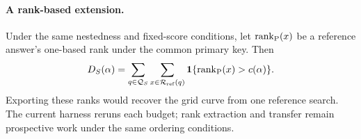 \paragraph{A rank-based extension.}
Under the same nestedness and fixed-score conditions, let
$\operatorname{rank}_{\rm P}(x)$ be a reference answer's one-based rank under the
common primary key. Then
\begin{equation}
 D_S(\alpha)=\sum_{q\in\mathcal Q_S}\sum_{x\in\mathcal R_{\rm ref}(q)}
 \mathbf1\{\operatorname{rank}_{\rm P}(x)>c(\alpha)\}.
 \label{eq:6-rank-curve}
\end{equation}
Exporting these ranks would recover the grid curve from one reference
search. The current harness reruns each budget; rank extraction and
transfer remain prospective work under the same ordering conditions.
